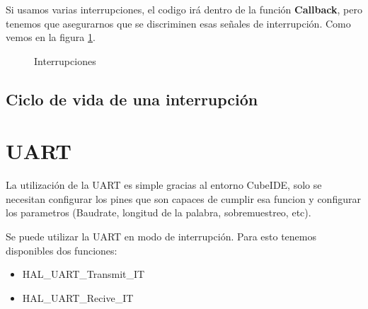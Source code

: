 \documentclass[a4paper,12pt]{report} %
\begin{document}
Si usamos varias interrupciones, el codigo irá dentro de la función \textbf{Callback}, pero tenemos que asegurarnos que se discriminen esas señales de interrupción. Como vemos en la figura \ref{interrupt}.

\begin{figure}[H]
	\centering
	\caption{Interrupciones}
	\label{interrupt}
\end{figure}

\subsection{Ciclo de vida de una interrupción}



\section{UART}

La utilización de la UART es simple gracias al entorno CubeIDE, solo se necesitan configurar los pines que son capaces de cumplir esa funcion y configurar los parametros (Baudrate, longitud de la palabra, sobremuestreo, etc).

Se puede utilizar la UART en modo de interrupción. Para esto tenemos disponibles dos funciones: 


\begin{itemize}
	\item HAL\_UART\_Transmit\_IT
	\item HAL\_UART\_Recive\_IT
\end{itemize}
\end{document}
